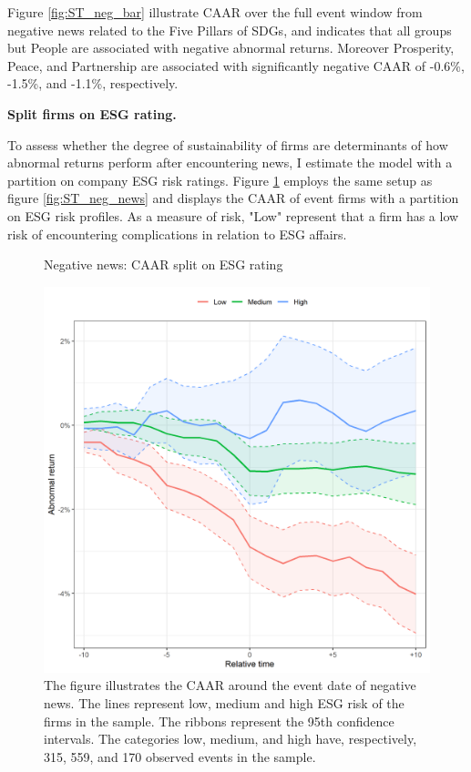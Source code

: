 Figure \ref{fig:ST_neg_bar} illustrate CAAR over the full event window from negative news related to the Five Pillars of SDGs, and indicates that all groups but People are associated with negative abnormal returns. Moreover Prosperity, Peace, and Partnership are associated with significantly negative CAAR of -0.6\%, -1.5\%, and -1.1\%, respectively.       

\noindent \textbf{Split firms on ESG rating.} 

To assess whether the degree of sustainability of firms are determinants of how abnormal returns perform after encountering news, I estimate the model with a partition on company ESG risk ratings. Figure \ref{fig:ST_neg_ESG} employs the same setup as figure \ref{fig:ST_neg_news} and displays the CAAR of event firms with a partition on ESG risk profiles. As a measure of risk, "Low" represent that a firm has a low risk of encountering complications in relation to ESG affairs.

\begin{figure} [H]
    \centering
    \caption{Negative news: CAAR split on ESG rating}
    \includegraphics[scale=0.6]{Projekt/1.Figures analysis/ST_negative_ESG.png}
     \caption*{\footnotesize The figure illustrates the CAAR around the event date of negative news. The lines represent low, medium and high ESG risk of the firms in the sample. The ribbons represent the 95th confidence intervals. The categories low, medium, and high have, respectively, 315, 559, and 170 observed events in the sample. }
    \label{fig:ST_neg_ESG}
\end{figure} 


